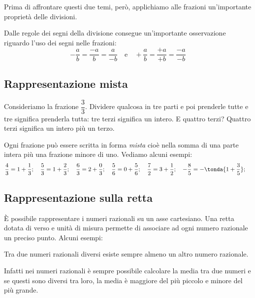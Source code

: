 Prima di affrontare questi due temi, però, applichiamo alle frazioni 
un'importante proprietà delle divisioni.

\begin{osservazione}{}{}
 Dalle regole dei segni della divisione consegue un'importante osservazione 
riguardo l'uso dei segni nelle frazioni:
\[-\dfrac{a}{b} = \dfrac{-a}{b} = \dfrac{a}{-b} \quad \text{e} \quad
  +\dfrac{a}{b} = \dfrac{+a}{+b} = \dfrac{-a}{-b}
\]
\end{osservazione}

\subsection{Rappresentazione mista}
\label{sub:razionali_rappresentazione_mista}

Consideriamo la frazione \(\dfrac{3}{3}\). Dividere qualcosa in tre parti e 
poi prenderle tutte e tre significa prenderla tutta: tre terzi significa 
un intero. E quattro terzi? Quattro terzi significa un intero più un terzo.

Ogni frazione può essere scritta in forma \emph{mista} cioè nella somma di 
una parte intera più una frazione minore di uno. Vediamo alcuni esempi:
\[\frac{4}{3} = 1 + \frac{1}{3}; \quad
\frac{5}{3} = 1 + \frac{2}{3}; \quad
\frac{6}{3} = 2 + \frac{0}{3}; \quad
\frac{5}{6} = 0 + \frac{5}{6}; \quad
\frac{7}{2} = 3 + \frac{1}{2}; \quad
-\frac{8}{5} = -\tonda{1 + \frac{3}{5}}; \quad
\]

\subsection{Rappresentazione sulla retta}
\label{sub:razionali_rappresentazione_retta}

È possibile rappresentare i numeri razionali su un asse cartesiano. Una 
retta dotata di verso e unità di misura permette di associare ad ogni 
numero razionale un preciso punto. Alcuni esempi:

\begin{center}
 \rettafra
\end{center}

\begin{teorema}{}{}
 Tra due numeri razionali diversi esiste sempre almeno un altro numero 
razionale.
\end{teorema}

Infatti nei numeri razionali è sempre possibile calcolare la media tra due 
numeri e se questi sono diversi tra loro, la media è maggiore del più 
piccolo e minore del più grande.

